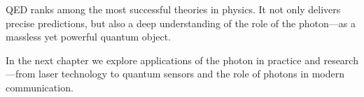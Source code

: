 QED ranks among the most successful theories in physics. It not only delivers precise predictions, but also a deep understanding of the role of the photon—as a massless yet powerful quantum object.

\vspace{1em}
\begin{tcolorbox}[hinweisbox,title=Outlook to Chapter VI]
	\label{box:Ausblick auf Kapitel 6}
	In the next chapter we explore applications of the photon in practice and research—from laser technology to quantum sensors and the role of photons in modern communication.
\end{tcolorbox}

